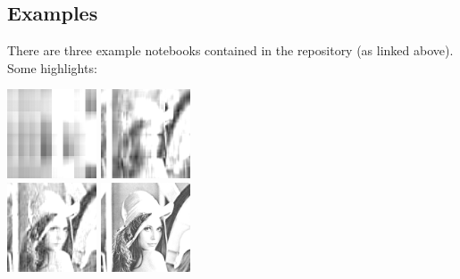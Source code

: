 \documentclass[12pt]{article}
\newenvironment{Figure}
  {\par\medskip\noindent\minipage{\linewidth}}
  {\endminipage\par\medskip}
\begin{document}
\begin{multicols}{2}
	\subsection{Examples}
	There are three example notebooks contained in the repository (as
	linked above). Some highlights:

	\begin{Figure}
		\center\includegraphics[height=100px]{./Figures/lenna-chi-2.png}
		\includegraphics[height=100px]{./Figures/lenna-chi-9.png}\\
		\includegraphics[height=100px]{./Figures/lenna-chi-20.png}
		\includegraphics[height=100px]{./Figures/lenna-chi-100.png}
		\label{lenna-compression}
	\end{Figure}


\end{multicols}
\end{document}

